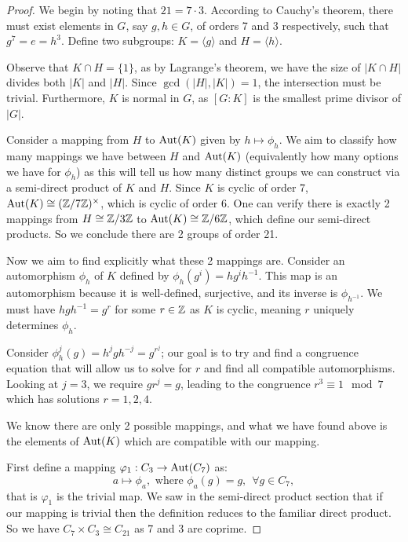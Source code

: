 \begin{proof}
We begin by noting that $21 = 7 \cdot 3$. According to Cauchy's theorem, there must exist elements in $G$, say $g, h \in G$, of orders 7 and 3 respectively, such that $g^7 = e = h^3$. Define two subgroups: $K = \langle g \rangle$ and $H = \langle h \rangle$.

Observe that $K \cap H = \{1\}$, as by Lagrange's theorem, we have the size of $|K \cap H|$ divides both $|K|$ and $|H|$. Since $\gcd(|H|, |K|) = 1$, the intersection must be trivial. Furthermore, $K$ is normal in $G$, as $[G:K]$ is the smallest prime divisor of $|G|$.

Consider a mapping from $H$ to $\operatorname{Aut}(K)$ given by $h \mapsto \phi_h$. We aim to classify how many mappings we have between $H$ and $\operatorname{Aut}(K)$ (equivalently how many options we have for $\phi_h$) as this will tell us how many distinct groups we can construct via a semi-direct product of $K$ and $H$. Since $K$ is cyclic of order 7, $\operatorname{Aut}(K) \cong (\mathbb{Z}/7\mathbb{Z})^{\times}$, which is cyclic of order 6. One can verify there is exactly 2 mappings from $H \cong \mathbb Z/3\mathbb Z$ to $\operatorname{Aut}(K) \cong \mathbb Z/6\mathbb Z$, which define our semi-direct products. So we conclude there are 2 groups of order 21. 

Now we aim to find explicitly what these 2 mappings are. Consider an automorphism $\phi_h$ of $K$ defined by $\phi_h(g^i) = hg^ih^{-1}$. This map is an automorphism because it is well-defined, surjective, and its inverse is $\phi_{h^{-1}}$. We must have $hgh^{-1} = g^r$ for some $r \in \mathbb Z$ as $K$ is cyclic, meaning $r$ uniquely determines $\phi_h$. 

Consider $\phi_h^{j}(g) = h^jgh^{-j} = g^{r^j}$; our goal is to try and find a congruence equation that will allow us to solve for $r$ and find all compatible automorphisms. Looking at $j = 3$, we require $g{r^j} = g$, leading to the congruence $r^3 \equiv 1 \mod 7$ which has solutions $r = 1, 2, 4$. 

We know there are only 2 possible mappings, and what we have found above is the elements of $\operatorname{Aut}(K)$ which are compatible with our mapping. 

First define a mapping $\varphi_1 : C_3 \rightarrow \operatorname{Aut}(C_7)$ as:
$$
a \mapsto \phi_a, \text{ where } \phi_a(g) = g, \hspace{5pt} \forall g \in C_7,
$$
that is $\varphi_1$ is the trivial map. We saw in the semi-direct product section that if our mapping is trivial then the definition reduces to the familiar direct product. So we have $C_7 \times C_3 \cong C_{21}$ as 7 and 3 are coprime.


\end{proof}
